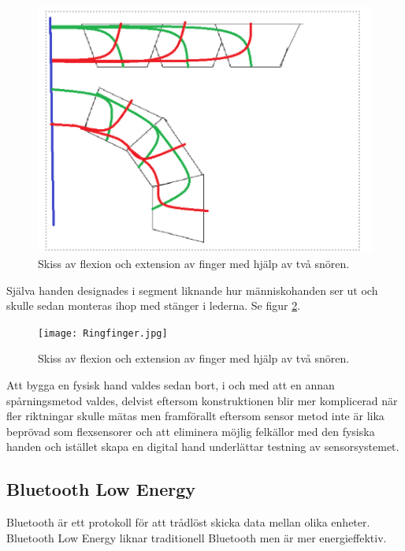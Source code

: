 \documentclass[a4paper]{article}
\begin{document}
\begin{sloppypar}
  \begin{figure}[H]
    \centering
    \includegraphics[width=\textwidth]{Skiss-flexion-och-extension.png}
    \caption{Skiss av flexion och extension av finger med hjälp av två snören.}
    \label{fig:flexion-extension}
  \end{figure}

  Själva handen designades i segment liknande hur människohanden ser ut och skulle sedan monteras ihop med stänger i lederna. Se figur \ref{fig:Ringfinger}.

  \begin{figure}[H]
    \centering
    \texttt{[image: Ringfinger.jpg]}
    \caption{Skiss av flexion och extension av finger med hjälp av två snören.}
    \label{fig:Ringfinger}
  \end{figure}

  Att bygga en fysisk hand valdes sedan bort, i och med att en annan spårningsmetod valdes, delvist eftersom konstruktionen blir mer komplicerad när fler riktningar skulle mätas
  men framförallt eftersom sensor metod inte är lika beprövad som flexsensorer och att eliminera möjlig felkällor med den fysiska handen och istället skapa en digital hand underlättar testning av sensorsystemet.


  \subsection{Bluetooth Low Energy}
  Bluetooth är ett protokoll för att trådlöst skicka data mellan olika enheter. Bluetooth Low Energy liknar traditionell Bluetooth men är mer energieffektiv.~\cite{Bluetooth}


\end{sloppypar}
\end{document}
